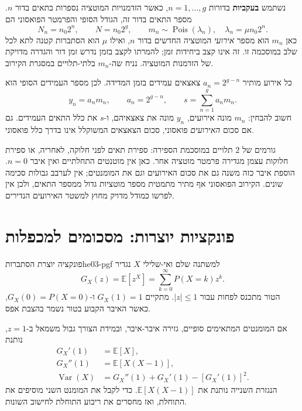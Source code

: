 נשתמש \textbf{בעקביות} בדורות $n=1,\ldots,g$, כאשר הזדמנויות המוטציה נספרות בתאים בדור $n$. מספר התאים בדור זה, הגודל הסופי והפרמטר הפואסוני הם
\begin{equation}\label{eq:he03-generation-definitions}
N_n=n_0 2^n,\qquad N=n_0 2^g,\qquad
m_n\sim\operatorname{Pois}(\lambda_n),\quad \lambda_n=\mu n_0 2^n.
\end{equation}
כאן $m_n$ הוא מספר \emph{אירועי} המוטציה החדשים בדור $n$, ואילו $\mu$ הוא הסתברות קטנה לתא לכל שלב במוסכמה זו. זה אינו קצב ביחידות זמן; להמרתו לקצב בזמן נדרש זמן דור והגדרה מדויקת של הזדמנות המוטציה. נניח שה-$m_n$ בלתי-תלויים במסגרת הקירוב.

כל אירוע מותיר $a_n=2^{g-n}$ צאצאים עמידים בזמן המדידה. לכן מספר העמידים הסופי הוא
\begin{equation}\label{eq:he03-mutant-sum}
y_n=a_nm_n,\qquad a_n=2^{g-n},\qquad s=\sum_{n=1}^g a_nm_n.
\end{equation}
חשוב להבחין: $m_n$ מונה אירועים, $y_n$ מונה את צאצאיהם, ו-$s$ את כלל התאים העמידים. גם אם סכום \emph{האירועים} פואסוני, סכום הצאצאים המשוקלל אינו בדרך כלל פואסוני.

\begin{remark}
גורמים של $2$ תלויים במוסכמת הספירה: ספירת תאים לפני חלוקה, לאחריה, או ספירת חלוקות עצמן מגדירה פרמטר מוטציה אחר. כאן אין מוטנטים התחלתיים ואין איבר $n=0$. הוספת איבר כזה משנה גם את סכום האירועים וגם את המומנטים; אין לערבב גבולות סכימה שונים. הקירוב הפואסוני אף מתיר מתמטית מספר מוטציות גדול ממספר התאים, ולכן אין לפרשו כמודל מדויק מחוץ למשטר האירועים הנדירים.
\end{remark}

\section{פונקציות יוצרות: מסכומים למכפלות}\label{sec:he03-pgf}
\begin{definition}{פונקציה יוצרת הסתברות}{he03-pgf}
למשתנה שלם ואי-שלילי $X$ נגדיר
\begin{equation}\label{eq:he03-pgf}
G_X(z)=\mathbb{E}[z^X]=\sum_{k=0}^\infty P(X=k)z^k.
\end{equation}
הטור מתכנס לפחות עבור $|z|\le1$. מתקיים $G_X(1)=1$ ו-$G_X(0)=P(X=0)$, כאשר האיבר הקבוע בטור נשמר בהצבת אפס.
\end{definition}
אם המומנטים המתאימים סופיים, גזירה איבר-איבר, ובמידת הצורך גבול משמאל ב-$z=1$, נותנת
\begin{align}
G_X'(1)&=\mathbb{E}[X],\label{eq:he03-pgf-first}\\
G_X''(1)&=\mathbb{E}[X(X-1)],\label{eq:he03-pgf-second}\\
\operatorname{Var}(X)&=G_X''(1)+G_X'(1)-[G_X'(1)]^2.\label{eq:he03-pgf-var}
\end{align}
הנגזרת השנייה נותנת את $\mathbb{E}[X(X-1)]$. כדי לקבל את המומנט השני מוסיפים את התוחלת, ואז מחסרים את ריבוע התוחלת לחישוב השונות.

